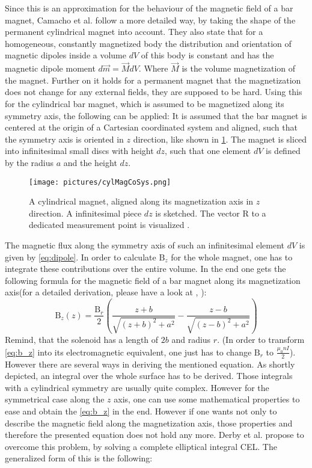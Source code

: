 Since this is an approximation for the behaviour of the magnetic field of a bar magnet, Camacho et al. \cite{camacho2013alternative} follow a more detailed way, by taking the shape of the permanent cylindrical magnet into account. They also state that for a homogeneous, constantly magnetized body the distribution and orientation of magnetic dipoles inside a volume $ dV $ of this body is constant and has the magnetic dipole moment $ d\vec{m} = \vec{M}dV $. Where $ \vec{M} $ is the volume magnetization of the magnet. Further on it holds for a permanent magnet that the magnetization does not change for any external fields, they are supposed to be hard. Using this for the cylindrical bar magnet, which is assumed to be magnetized along its symmetry axis, the following can be applied: It is assumed that the bar magnet is centered at the origin of a Cartesian coordinated system and aligned, such that the symmetry axis is oriented in $ z $ direction, like shown in \ref{fig:cylMag}. The magnet is sliced into infinitesimal small discs with height $ dz $, such that one element $ dV $ is defined by the radius $ a $ and the height $ dz $. 
\begin{figure}
\centering
\texttt{[image: pictures/cylMagCoSys.png]}
\caption{A cylindrical magnet, aligned along its magnetization axis in $ z $ direction. A infinitesimal piece $ dz $ is sketched. The vector R to a dedicated measurement point is visualized \cite{derby2010cylindrical}.}
\label{fig:cylMag}
\end{figure}
The magnetic flux along the symmetry axis of such an infinitesimal element $ dV $ is given by \ref{eq:dipole}. In order to calculate $ \mathrm{B}_{z} $ for the whole magnet, one has to integrate these contributions over the entire volume. In the end one gets the following formula for the magnetic field of a bar magnet along its magnetization axis(for a detailed derivation, please have a look at \cite{camacho2013alternative}, \cite{derby2010cylindrical}):
\begin{equation} \label{eq:b_z}
\mathrm{B}_{z}(z) = \frac{\mathrm{B}_r}{2} \left ( \frac{z + b}{\sqrt{(z + b)^2 + a^2}} - \frac{z - b}{\sqrt{(z - b)^2 + a^2}} \right)
\end{equation}
Remind, that the solenoid has a length of $ 2b $ and radius $ r $. (In order to transform \ref{eq:b_z} into its electromagnetic equivalent, one just has to change $ \mathrm{B}_r $ to $ \frac{\mu_{0} n I}{2} $).\\
However there are several ways in deriving the mentioned equation. As shortly depicted, an integral over the whole surface has to be derived. Those integrals with a cylindrical symmetry are usually quite complex. However for the symmetrical case along the $ z $ axis, one can use some mathematical properties to ease and obtain the \ref{eq:b_z} in the end. However if one wants not only to describe the magnetic field along the magnetization axis, those properties and therefore the presented equation does not hold any more. Derby et al. \cite{derby2010cylindrical} propose to overcome this problem, by solving a complete elliptical integral \ac{CEL}. The generalized form of this is the following:
